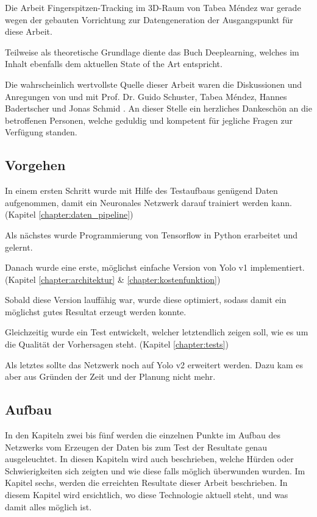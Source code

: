 Die Arbeit \grqq{}Fingerspitzen-Tracking im 3D-Raum\grqq{} von Tabea Méndez \cite{TabeasFingertracking} war gerade wegen der gebauten Vorrichtung zur Datengeneration der Ausgangspunkt für diese Arbeit.

Teilweise als theoretische Grundlage diente das Buch Deeplearning\cite{deeplearning}, welches im Inhalt ebenfalls dem aktuellen State of the Art entspricht.

Die wahrscheinlich wertvollste Quelle dieser Arbeit waren die Diskussionen und Anregungen von und mit Prof. Dr. Guido Schuster, Tabea Méndez, Hannes Badertscher und Jonas Schmid \cite{PrivateCommunication}. An dieser Stelle ein herzliches Dankeschön an die betroffenen Personen, welche geduldig und kompetent für jegliche Fragen zur Verfügung standen.

\subsection{Vorgehen}
\label{chapter:vorgehen}
In einem ersten Schritt wurde mit Hilfe des Testaufbaus\cite{TabeasFingertracking} genügend Daten aufgenommen, damit ein Neuronales Netzwerk darauf trainiert werden kann. (Kapitel \ref{chapter:daten_pipeline})

Als nächstes wurde Programmierung von Tensorflow in Python erarbeitet und gelernt.

Danach wurde eine erste, möglichst einfache Version von Yolo v1\cite{yolo} implementiert. (Kapitel \ref{chapter:architektur} \& \ref{chapter:kostenfunktion})

Sobald diese Version lauffähig war, wurde diese optimiert, sodass damit ein möglichst gutes Resultat erzeugt werden konnte.

Gleichzeitig wurde ein Test entwickelt, welcher letztendlich zeigen soll, wie es um die Qualität der Vorhersagen steht. (Kapitel \ref{chapter:tests}) 

Als letztes sollte das Netzwerk noch auf Yolo v2\cite{yolo2} erweitert werden. 
Dazu kam es aber aus Gründen der Zeit und der Planung nicht mehr.

\subsection{Aufbau}
In den Kapiteln zwei bis fünf werden die einzelnen Punkte im Aufbau des Netzwerks vom Erzeugen der Daten bis zum Test der Resultate genau ausgeleuchtet.
In diesen Kapiteln wird auch beschrieben, welche Hürden oder Schwierigkeiten sich zeigten und wie diese falls möglich überwunden wurden.
Im Kapitel sechs, werden die erreichten Resultate dieser Arbeit beschrieben.
In diesem Kapitel wird ersichtlich, wo diese Technologie aktuell steht, und was damit alles möglich ist.

